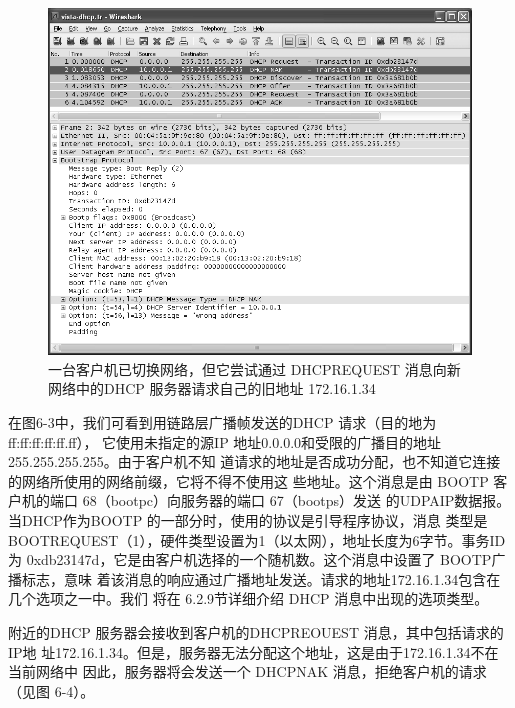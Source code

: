 \begin{figure}[H]
  \centering
  \includegraphics[scale=0.5]{imgs/6/6-4.png}
  \caption{一台客户机已切换网络，但它尝试通过 DHCPREQUEST 消息向新网络中的DHCP 服务器请求自己的旧地址 172.16.1.34}
\end{figure}

在图6-3中，我们可看到用链路层广播帧发送的DHCP 请求（目的地为ff:ff:ff:ff:ff.ff），
它使用未指定的源IP 地址0.0.0.0和受限的广播目的地址 255.255.255.255。由于客户机不知
道请求的地址是否成功分配，也不知道它连接的网络所使用的网络前缀，它将不得不使用这
些地址。这个消息是由 BOOTP 客户机的端口 68（bootpc）向服务器的端口 67（bootps）发送
的UDPAIP数据报。当DHCP作为BOOTP 的一部分时，使用的协议是引导程序协议，消息
类型是 BOOTREQUEST（1），硬件类型设置为1（以太网），地址长度为6字节。事务ID 为
0xdb23147d，它是由客户机选择的一个随机数。这个消息中设置了 BOOTP广播标志，意味
着该消息的响应通过广播地址发送。请求的地址172.16.1.34包含在几个选项之一中。我们
将在 6.2.9节详细介绍 DHCP 消息中出现的选项类型。

附近的DHCP 服务器会接收到客户机的DHCPREOUEST 消息，其中包括请求的IP地
址172.16.1.34。但是，服务器无法分配这个地址，这是由于172.16.1.34不在当前网络中
因此，服务器将会发送一个 DHCPNAK 消息，拒绝客户机的请求（见图 6-4）。

